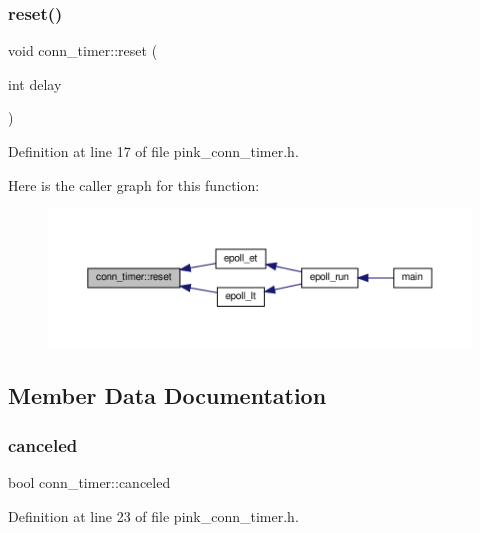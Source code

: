 \subsubsection{\texorpdfstring{reset()}{reset()}}
{\footnotesize\ttfamily void conn\+\_\+timer\+::reset (\begin{DoxyParamCaption}\item[{int}]{delay }\end{DoxyParamCaption})\hspace{0.3cm}{\ttfamily [inline]}}



Definition at line 17 of file pink\+\_\+conn\+\_\+timer.\+h.

Here is the caller graph for this function\+:
\nopagebreak
\begin{figure}[H]
\begin{center}
\leavevmode
\includegraphics[width=350pt]{classconn__timer_a6cb5ef510c4022acd31b002e15758d60_icgraph}
\end{center}
\end{figure}


\subsection{Member Data Documentation}
\mbox{\label{classconn__timer_a51dd2abd61d07bd63c37551404851bf5}} 
\subsubsection{\texorpdfstring{canceled}{canceled}}
{\footnotesize\ttfamily bool conn\+\_\+timer\+::canceled}



Definition at line 23 of file pink\+\_\+conn\+\_\+timer.\+h.

\mbox{\label{classconn__timer_a0f3fbb63bdf0764fffe4b5fd0fedc3db}} 
